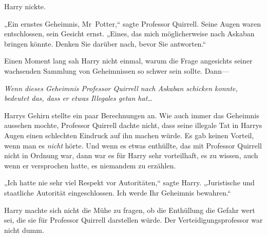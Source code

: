 Harry nickte.

„Ein ernstes Geheimnis, Mr~Potter,“ sagte Professor Quirrell. Seine Augen waren entschlossen, sein Gesicht ernst. „Eines, das mich möglicherweise nach Askaban bringen könnte. Denken Sie darüber nach, bevor Sie antworten.“

Einen Moment lang sah Harry nicht einmal, warum die Frage angesichts seiner wachsenden Sammlung von Geheimnissen so schwer sein sollte. Dann—

\emph{Wenn dieses Geheimnis Professor Quirrell nach Askaban schicken konnte, bedeutet das, dass er etwas Illegales getan hat…}

Harrys Gehirn stellte ein paar Berechnungen an. Wie auch immer das Geheimnis aussehen mochte, Professor Quirrell dachte nicht, dass seine illegale Tat in Harrys Augen einen schlechten Eindruck auf ihn machen würde. Es gab keinen Vorteil, wenn man es \emph{nicht} hörte. Und wenn es etwas enthüllte, das mit Professor Quirrell nicht in Ordnung war, dann war es für Harry sehr vorteilhaft, es zu wissen, auch wenn er versprochen hatte, es niemandem zu erzählen.

„Ich hatte nie sehr viel Respekt vor Autoritäten,“ sagte Harry. „Juristische und staatliche Autorität eingeschlossen. Ich werde Ihr Geheimnis bewahren.“

Harry machte sich nicht die Mühe zu fragen, ob die Enthüllung die Gefahr wert sei, die sie für Professor Quirrell darstellen würde. Der Verteidigungsprofessor war nicht dumm.

